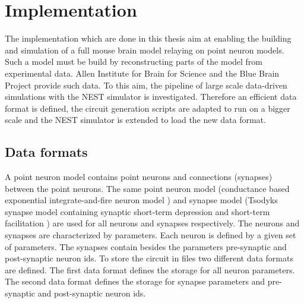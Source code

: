 %

\chapter{Implementation}

The implementation which are done in this thesis aim at enabling the building and simulation
of a full mouse brain model relaying on point neuron models. Such a model must be build by
reconstructing parts of the model from experimental data.
Allen Institute for Brain for Science and the Blue Brain Project provide such data.
To this aim, the pipeline of large scale data-driven simulations with the NEST simulator is investigated.
Therefore an efficient data format is defined, the circuit generation scripts are adapted to
run on a bigger scale and the NEST simulator is extended to load the new data format.

\section{Data formats}
\label{sec:dataformats}
A point neuron model contains point neurons and connections (synapses) between the point neurons.
The same point neuron model (conductance based exponential integrate-and-fire neuron model \cite{brette2005adaptive}) and synapse model (Tsodyks synapse model containing synaptic short-term depression and short-term facilitation \cite{tsodyks1997neural, fuhrmann2002coding}) are used for all neurons and synapses respectively.
The neurons and synapses are characterized by parameters.
Each neuron is defined by a given set of parameters.
The synapses contain besides the parameters pre-synaptic and post-synaptic neuron ids.
To store the circuit in files two different data formats are defined.
The first data format defines the storage for all neuron parameters.
The second data format defines the storage for synapse parameters and pre-synaptic and post-synaptic neuron ids.

